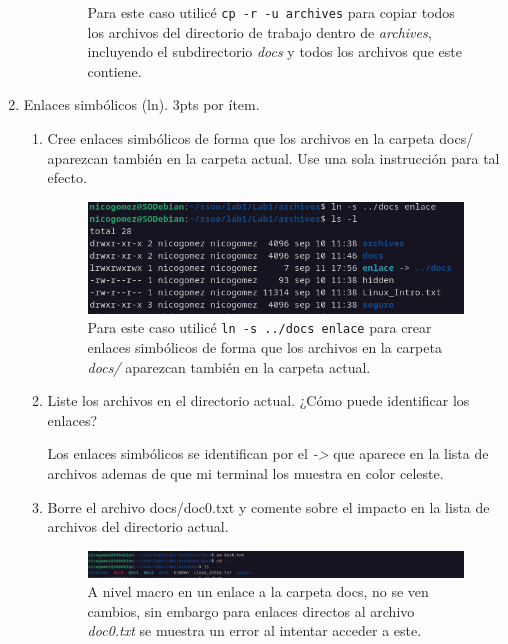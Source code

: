 \documentclass{templateNote}
\begin{document}
\begin{enumerate}
\begin{enumerate}[label=\alph*)]
\begin{figure}[H]
            Para este caso utilicé \texttt{cp -r -u archives} para copiar todos los archivos del directorio de trabajo dentro de \textit{archives}, incluyendo el subdirectorio \textit{docs} y todos los archivos que este contiene.
        \end{figure}
    \end{enumerate}
    \item Enlaces simbólicos (ln).  3pts por ítem.
    \begin{enumerate}[label=\alph*)]
        \item Cree enlaces simbólicos de forma que los archivos en la carpeta docs/ aparezcan también en la carpeta actual. Use una sola instrucción para tal efecto.
        \begin{figure}[H]
            \centering
            \includegraphics[width=\textwidth]{img/ejerc6a.png}
            Para este caso utilicé \texttt{ln -s ../docs enlace} para crear enlaces simbólicos de forma que los archivos en la carpeta \textit{docs/} aparezcan también en la carpeta actual.
        \end{figure}
        \item Liste los archivos en el directorio actual. ¿Cómo puede identificar los enlaces?
        \begin{center}
            Los enlaces simbólicos se identifican por el \textit{->} que aparece en la lista de archivos ademas de que mi terminal los muestra en color celeste.
        \end{center}
        \item Borre el archivo docs/doc0.txt y comente sobre el impacto en la lista de archivos del directorio actual.
        \begin{figure}[H]
            \centering
            \includegraphics[width=\textwidth]{img/ejerc6c.png}
            A nivel macro en un enlace a la carpeta docs, no se ven cambios, sin embargo para enlaces directos al archivo \textit{doc0.txt} se muestra un error al intentar acceder a este.

\end{figure}
\end{enumerate}
\end{enumerate}
\end{document}
